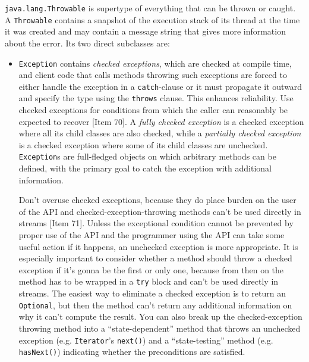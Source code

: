 \documentclass[8pt, table, xcdraw]{article}%
\begin{document}
\lstinline{java.lang.Throwable} is supertype of everything that can be thrown or caught. A \lstinline{Throwable} contains a snapshot of the execution stack of its thread at the time it was created and may contain a message string that gives more information about the error. Its two direct subclasses are:
\begin{itemize}
    \item \lstinline{Exception} contains \emph{checked exceptions}, which are checked at compile time, and client code that calls methods throwing such exceptions are forced to either handle the exception in a \lstinline{catch}-clause or it must propagate it outward and specify the type using the \lstinline{throws} clause. This enhances reliability. Use checked exceptions for conditions from which the caller can reasonably be expected to recover [Item 70]. A \emph{fully checked exception} is a checked exception where all its child classes are also checked, while a \emph{partially checked exception} is a checked exception where some of its child classes are unchecked. \lstinline{Exception}s are full-fledged objects on which arbitrary methods can be defined, with the primary goal to catch the exception with additional information.

    Don't overuse checked exceptions, because they do place burden on the user of the API and checked-exception-throwing methods can't be used directly in streams [Item 71]. Unless the exceptional condition cannot be prevented by proper use of the API and the programmer using the API can take some useful action if it happens, an unchecked exception is more appropriate. It is especially important to consider whether a method should throw a checked exception if it's gonna be the first or only one, because from then on the method has to be wrapped in a \lstinline{try} block and can't be used directly in streams. The easiest way to eliminate a checked exception is to return an \lstinline{Optional}, but then the method can’t return any additional information on why it can't compute the result. You can also break up the checked-exception throwing method into a “state-dependent” method that throws an unchecked exception (e.g. \lstinline{Iterator}'s \lstinline{next()}) and a “state-testing” method (e.g. \lstinline{hasNext()}) indicating whether the preconditions are satisfied.
    

\end{itemize}
\end{document}
